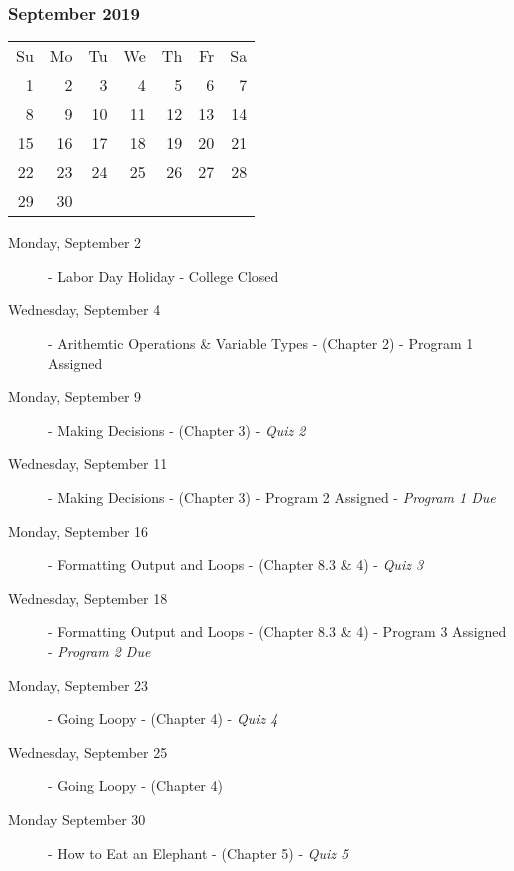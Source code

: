 \subsubsection*{September 2019}
\begin{tabular}{rrrrrrr}
Su & Mo & Tu & We & Th & Fr & Sa\\
 1 &  2 &  3 &  4 &  5 &  6 & 7\\
 8 &  9 & 10 & 11 & 12 & 13 & 14\\
15 & 16 & 17 & 18 & 19 & 20 & 21\\
22 & 23 & 24 & 25 & 26 & 27 & 28\\
29 & 30 &    &    &    &    &   \\
\end{tabular}
\begin{description}
\item[Monday, September 2] - Labor Day Holiday - College Closed
\item[Wednesday, September 4] 
  - Arithemtic Operations \& Variable Types
  \newline- (Chapter 2)
  \newline- Program 1 Assigned

\item[Monday, September 9] 
  - Making Decisions
  \newline- (Chapter 3)
  \newline- {\em Quiz 2}
\item[Wednesday, September 11] 
  - Making Decisions
  \newline- (Chapter 3)
  \newline- Program 2 Assigned
  \newline- {\em Program 1 Due}

\item[Monday, September 16] 
  - Formatting Output and Loops
  \newline- (Chapter 8.3 \& 4)
  \newline- {\em Quiz 3}
\item[Wednesday, September 18] 
  - Formatting Output and Loops
  \newline- (Chapter 8.3 \& 4)
  \newline- Program 3 Assigned
  \newline- {\em Program 2 Due}

\item[Monday, September 23] 
  - Going Loopy
  \newline- (Chapter 4)
  \newline- {\em Quiz 4}
\item[Wednesday, September 25] 
  - Going Loopy
  \newline- (Chapter 4)

\item[Monday September 30] 
  - How to Eat an Elephant
  \newline- (Chapter 5)
  \newline- {\em Quiz 5}
\end{description}
\hrulefill


